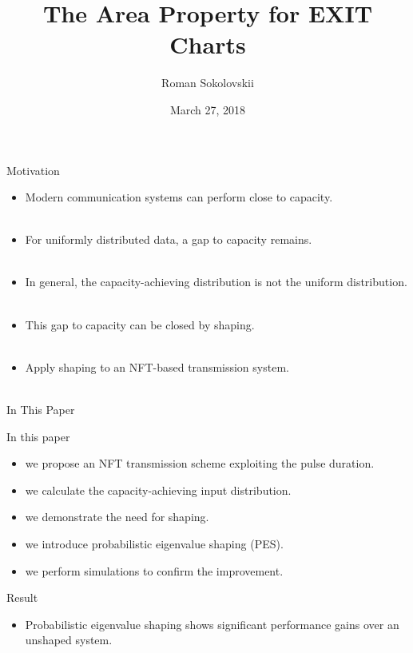 \documentclass[
	9pt,							%
	mathserif, 				%
	handout, 				%
]{beamer}
\title[The Area Property for EXIT Charts]{ {\huge The Area Property for EXIT Charts}}
\author[R. Sokolovskii]{Roman Sokolovskii}
\institute{
	\emph{\href{mailto:roman.sokolovskii@chalmers.se}{roman.sokolovskii@chalmers.se}}
	}
\date{March 27, 2018}
\begin{document}
\begin{frame}[plain]
\titlepage %
\end{frame}

\begin{frame}{Motivation}
	\begin{itemize}
		\item Modern communication systems can perform close to capacity.\\~
		\item For uniformly distributed data, a gap to capacity remains.\\~
		\item In general, the capacity-achieving distribution is not the uniform distribution.\\~
		\item This gap to capacity can be closed by shaping.\\~
		\item Apply shaping to an NFT-based transmission system.\\~
	\end{itemize}
\end{frame}

\begin{frame}{In This Paper}
\begin{alertblock}{In this paper}
\begin{itemize}
	\item we propose an NFT transmission scheme exploiting the pulse duration.
	\item we calculate the capacity-achieving input distribution.
	\item we demonstrate the need for shaping.
	\item we introduce probabilistic eigenvalue shaping (PES).
	\item we perform simulations to confirm the improvement.
	
\end{itemize}
\end{alertblock}

\vskip 0.25cm

\begin{block}{Result}
	\begin{itemize}
	\item Probabilistic eigenvalue shaping shows significant performance gains over an unshaped system.
	\end{itemize}
\end{block}

\end{frame}
\end{document}
